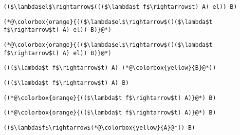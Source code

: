 \documentclass{beamer}
\begin{document}
\begin{frame}[fragile]{\CurrentSection}
\lstset{basicstyle=\ttfamily\small}\lstset{numbers=none}\lstset{language=ML}\begin{lstlisting}
(($\lambda$el$\rightarrow$((($\lambda$t f$\rightarrow$t) A) el)) B)
\end{lstlisting}
\pause\lstset{language=ML}\begin{lstlisting}
(*@\colorbox{orange}{(($\lambda$el$\rightarrow$((($\lambda$t f$\rightarrow$t) A) el)) B)}@*)
\end{lstlisting}

\end{frame}

\begin{frame}[fragile]{\CurrentSection}
\lstset{basicstyle=\ttfamily\small}\lstset{numbers=none}\lstset{language=ML}\begin{lstlisting}
(*@\colorbox{orange}{(($\lambda$el$\rightarrow$((($\lambda$t f$\rightarrow$t) A) el)) B)}@*)
\end{lstlisting}
\pause\lstset{language=ML}\begin{lstlisting}
((($\lambda$t f$\rightarrow$t) A) (*@\colorbox{yellow}{B}@*))
\end{lstlisting}

\end{frame}

\begin{frame}[fragile]{\CurrentSection}
\lstset{basicstyle=\ttfamily\small}\lstset{numbers=none}\lstset{language=ML}\begin{lstlisting}
((($\lambda$t f$\rightarrow$t) A) B)
\end{lstlisting}
\pause\lstset{language=ML}\begin{lstlisting}
((*@\colorbox{orange}{(($\lambda$t f$\rightarrow$t) A)}@*) B)
\end{lstlisting}

\end{frame}

\begin{frame}[fragile]{\CurrentSection}
\lstset{basicstyle=\ttfamily\small}\lstset{numbers=none}\lstset{language=ML}\begin{lstlisting}
((*@\colorbox{orange}{(($\lambda$t f$\rightarrow$t) A)}@*) B)
\end{lstlisting}
\pause\lstset{language=ML}\begin{lstlisting}
(($\lambda$f$\rightarrow$(*@\colorbox{yellow}{A}@*)) B)
\end{lstlisting}

\end{frame}
\end{document}
